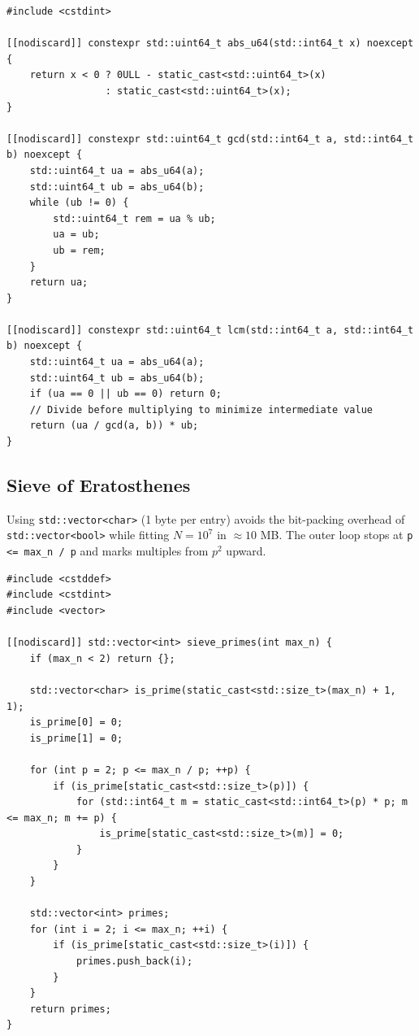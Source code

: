 \documentclass[11pt,a4paper]{article}
\theoremstyle{definition}
\begin{document}
\begin{lstlisting}[caption={UB-Free Euclidean GCD and Divide-First LCM}]
#include <cstdint>

[[nodiscard]] constexpr std::uint64_t abs_u64(std::int64_t x) noexcept {
    return x < 0 ? 0ULL - static_cast<std::uint64_t>(x)
                 : static_cast<std::uint64_t>(x);
}

[[nodiscard]] constexpr std::uint64_t gcd(std::int64_t a, std::int64_t b) noexcept {
    std::uint64_t ua = abs_u64(a);
    std::uint64_t ub = abs_u64(b);
    while (ub != 0) {
        std::uint64_t rem = ua % ub;
        ua = ub;
        ub = rem;
    }
    return ua;
}

[[nodiscard]] constexpr std::uint64_t lcm(std::int64_t a, std::int64_t b) noexcept {
    std::uint64_t ua = abs_u64(a);
    std::uint64_t ub = abs_u64(b);
    if (ua == 0 || ub == 0) return 0;
    // Divide before multiplying to minimize intermediate value
    return (ua / gcd(a, b)) * ub;
}
\end{lstlisting}

\subsection{Sieve of Eratosthenes}

Using \texttt{std::vector<char>} (1 byte per entry) avoids the bit-packing overhead of \texttt{std::vector<bool>} while fitting $N = 10^7$ in $\approx 10$ MB. The outer loop stops at \texttt{p <= max\_n / p} and marks multiples from $p^2$ upward.

\begin{lstlisting}[caption={Sieve of Eratosthenes Generating All Primes up to $N$}]
#include <cstddef>
#include <cstdint>
#include <vector>

[[nodiscard]] std::vector<int> sieve_primes(int max_n) {
    if (max_n < 2) return {};

    std::vector<char> is_prime(static_cast<std::size_t>(max_n) + 1, 1);
    is_prime[0] = 0;
    is_prime[1] = 0;

    for (int p = 2; p <= max_n / p; ++p) {
        if (is_prime[static_cast<std::size_t>(p)]) {
            for (std::int64_t m = static_cast<std::int64_t>(p) * p; m <= max_n; m += p) {
                is_prime[static_cast<std::size_t>(m)] = 0;
            }
        }
    }

    std::vector<int> primes;
    for (int i = 2; i <= max_n; ++i) {
        if (is_prime[static_cast<std::size_t>(i)]) {
            primes.push_back(i);
        }
    }
    return primes;
}
\end{lstlisting}
\end{document}
